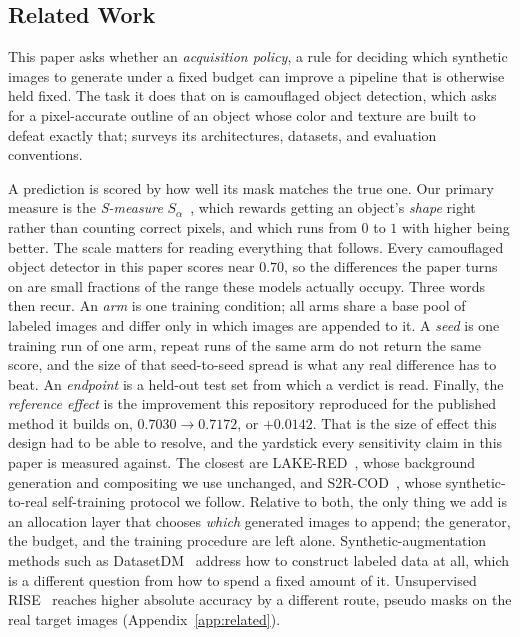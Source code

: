 \documentclass{article}
\begin{document}
\subsection{Related Work}
\label{sec:related}
This paper asks whether an \emph{acquisition policy}, a rule for
deciding which synthetic images to generate under a fixed budget can improve a pipeline that is
otherwise held fixed. The task it does that on is camouflaged object detection, which asks for a
pixel-accurate outline of an object whose color and texture are built to defeat exactly that;
\citet{fan2023advances} surveys its architectures, datasets, and evaluation conventions.

A prediction is scored by how well its mask matches the true one. Our primary measure is the \emph{S-measure} $S_\alpha$~\citep{fan2017structure}, which rewards getting an object's \emph{shape} right rather than counting correct pixels, and which runs
from $0$ to $1$ with higher being better. The scale matters for reading everything that follows. Every
camouflaged object detector in this paper scores near $0.70$, so the differences the paper turns on are small fractions
of the range these models actually occupy. Three words then recur. An \textit{arm} is one training
condition; all arms share a base pool of labeled images and differ only in which images are
appended to it. A \textit{seed} is one training run of one arm, repeat runs of the same arm do
not return the same score, and the size of that seed-to-seed spread is what any real difference has
to beat. An \textit{endpoint} is a held-out test set from which a verdict is read. Finally, the
\textit{reference effect} is the improvement this repository reproduced for the published method it
builds on, $0.7030 \rightarrow 0.7172$, or $+0.0142$. That is the size of effect this design had to
be able to resolve, and the yardstick every sensitivity claim in this paper is measured against. The closest are LAKE-RED~\citep{zhao2024lakered}, whose background generation and compositing we use unchanged, and
S2R-COD~\citep{luo2025s2rcod}, whose synthetic-to-real self-training protocol we follow. Relative to
both, the only thing we add is an allocation layer that chooses \emph{which} generated images to
append; the generator, the budget, and the training procedure are left alone. Synthetic-augmentation methods such as DatasetDM~\citep{wu2023datasetdm} address how to construct labeled data at all, which is a different question from how to spend a fixed amount of it. Unsupervised RISE~\citep{du2025rise} reaches higher absolute accuracy by a different route, pseudo masks on the real target images (Appendix~\ref{app:related}).
\end{document}
